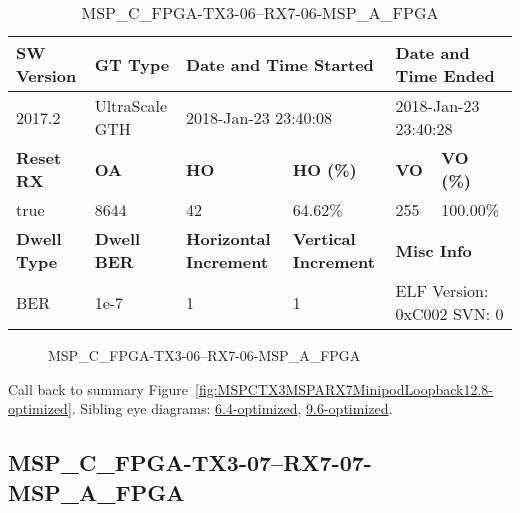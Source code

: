 \begin{table}[h]
\centering
\caption{MSP\_C\_FPGA-TX3-06--RX7-06-MSP\_A\_FPGA}
\label{tab:MSPCFPGATX306RX706MSPAFPGA12.8-optimized}
\begin{tabular}{@{}|l|l|l|l|l|l|@{}}
\toprule
\textbf{SW Version}                & \textbf{GT Type}   & \multicolumn{2}{l|}{\textbf{Date and Time Started}}            & \multicolumn{2}{l|}{\textbf{Date and Time Ended}}        \\ \midrule
2017.2                       & UltraScale GTH          & \multicolumn{2}{l|}{2018-Jan-23 23:40:08}                   & \multicolumn{2}{l|}{2018-Jan-23 23:40:28}               \\ \midrule
\textbf{Reset RX}                  & \textbf{OA} & \textbf{HO}   & \textbf{HO (\%)} & \textbf{VO} & \textbf{VO (\%)} \\ \midrule
true & 8644        & 42          & 64.62\%        & 255        & 100.00\%       \\ \midrule
\textbf{Dwell Type}                & \textbf{Dwell BER} & \textbf{Horizontal Increment} & \textbf{Vertical Increment}    & \multicolumn{2}{l|}{\textbf{Misc Info}}                  \\ \midrule
BER                            & 1e-7        & 1        & 1           & \multicolumn{2}{l|}{ELF Version: 0xC002 SVN: 0}                         \\ \bottomrule
\end{tabular}
\end{table}

\begin{figure}[h]
\caption{MSP\_C\_FPGA-TX3-06--RX7-06-MSP\_A\_FPGA} \label{fig:MSPCFPGATX306RX706MSPAFPGA12.8-optimized}
\end{figure}

Call back to summary Figure~\ref{fig:MSPCTX3MSPARX7MinipodLoopback12.8-optimized}.
Sibling eye diagrams: \hyperref[sec:MSPCFPGATX306RX706MSPAFPGA6.4-optimized]{6.4-optimized}, \hyperref[sec:MSPCFPGATX306RX706MSPAFPGA9.6-optimized]{9.6-optimized}.

\clearpage
\newpage


\subsection{MSP\_C\_FPGA-TX3-07--RX7-07-MSP\_A\_FPGA}\label{sec:MSPCFPGATX307RX707MSPAFPGA12.8-optimized}

